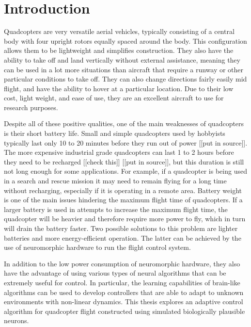 \documentclass[letterpaper,12pt,titlepage,oneside,final]{book}
\begin{document}
\section{Introduction}


Quadcopters are very versatile aerial vehicles, typically consisting of a central body with four upright rotors equally spaced around the body. 
This configuration allows them to be lightweight and simplifies construction. 
They also have the ability to take off and land vertically without external assistance, meaning they can be used in a lot more situations than aircraft that require a runway or other particular conditions to take off. 
They can also change directions fairly easily mid flight, and have the ability to hover at a particular location. Due to their low cost, light weight, and ease of use, they are an excellent aircraft to use for research purposes.

Despite all of these positive qualities, one of the main weaknesses of quadcopters is their short battery life. 
Small and simple quadcopters used by hobbyists typically last only 10 to 20 minutes before they run out of power [[put in source]]. 
The more expensive industrial grade quadcopters can last 1 to 2 hours before they need to be recharged [[check this]] [[put in source]], but this duration is still not long enough for some applications. 
For example, if a quadcopter is being used in a search and rescue mission it may need to remain flying for a long time without recharging, especially if it is operating in a remote area. 
Battery weight is one of the main issues hindering the maximum flight time of quadcopters. 
If a larger battery is used in attempts to increase the maximum flight time, the quadcopter will be heavier and therefore require more power to fly, which in turn will drain the battery faster. 
Two possible solutions to this problem are lighter batteries and more energy-efficient operation.
The latter can be achieved by the use of neuromorphic hardware to run the flight control system.

In addition to the low power consumption of neuromorphic hardware, they also have the advantage of using various types of neural algorithms that can be extremely useful for control.
In particular, the learning capabilities of brain-like algorithms can be used to develop controllers that are able to adapt to unknown environments with non-linear dynamics. 
This thesis explores an adaptive control algorithm for quadcopter flight constructed using simulated biologically plausible neurons.
\end{document}
